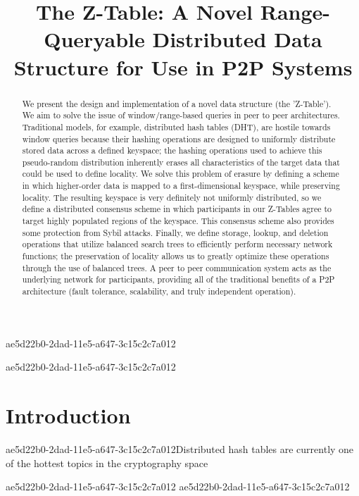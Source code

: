 \documentclass[12pt]{article}
\title{The Z-Table: A Novel Range-Queryable Distributed Data Structure for Use in P2P Systems}
\begin{document}
\maketitle
ae5d22b0-2dad-11e5-a647-3c15c2c7a012
\begin{abstract}
We present the design and implementation of a novel data structure (the 'Z-Table'). We aim to solve the issue of window/range-based queries in peer to peer architectures. Traditional models, for example,  distributed hash tables (DHT), are hostile towards window queries because their hashing operations are designed to uniformly distribute stored data across a defined keyspace; the hashing operations used to achieve this pseudo-random distribution inherently erases all characteristics of the target data that could be used to define locality. We solve this problem of erasure by defining a scheme in which higher-order data is mapped to a first-dimensional keyspace, while preserving locality. The resulting keyspace is very definitely not uniformly distributed, so we define a distributed consensus scheme in which participants in our Z-Tables agree to target highly populated regions of the keyspace. This consensus scheme also provides some protection from Sybil attacks. Finally, we define storage, lookup, and deletion operations that utilize balanced search trees to efficiently perform necessary network functions; the preservation of locality allows us to greatly optimize these operations through the use of balanced trees. A peer to peer communication system acts as the underlying network for participants, providing all of the traditional benefits of a P2P architecture (fault tolerance, scalability, and truly independent operation).
\end{abstract}


ae5d22b0-2dad-11e5-a647-3c15c2c7a012\newpage
\section{Introduction}
ae5d22b0-2dad-11e5-a647-3c15c2c7a012Distributed hash tables are currently one of the hottest topics in the cryptography space~\cite{Stoica:2001dj,Rowstron:2001ea,Ratnasamy:2001wn}

ae5d22b0-2dad-11e5-a647-3c15c2c7a012\printbibliography
ae5d22b0-2dad-11e5-a647-3c15c2c7a012
\end{document}
